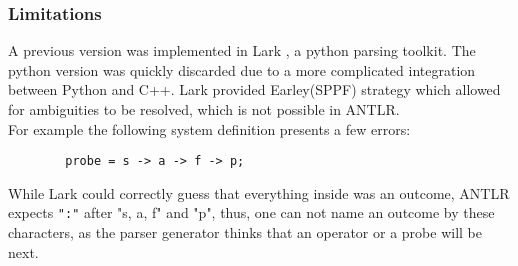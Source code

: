     \subsubsection{Limitations}
        A previous version was implemented in Lark \cite{lark}, a python parsing toolkit. The python version was quickly discarded due to a more complicated integration between Python and C++. Lark provided Earley(SPPF) strategy which allowed for ambiguities to be resolved, which is not possible in ANTLR. \\
        For example the following system definition presents a few errors:
        \begin{verbatim}
        probe = s -> a -> f -> p;
        \end{verbatim}
    While Lark could correctly guess that everything inside was an outcome, ANTLR expects \texttt{":"} after "s, a, f" and "p", thus, one can not name an outcome by these characters, as the parser generator thinks that an operator or a probe will be next.
   
